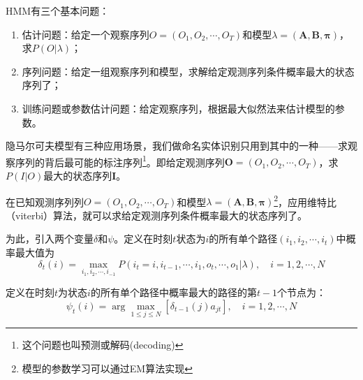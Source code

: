 \documentclass[a4paper,UTF8,no-math]{ctexart}
\begin{document}
	HMM有三个基本问题：
	
	\begin{enumerate}
		\item 估计问题：给定一个观察序列$O = (O_{1},O_{2}, \cdots ,O_{T})$和模型$\lambda=(\mathbf{A}, \mathbf{B},\mathbf{\pi})$，求$P(O | \lambda)$；
		\item 序列问题：给定一组观察序列和模型，求解给定观测序列条件概率最大的状态序列了；
		\item 训练问题或参数估计问题：给定观察序列，根据最大似然法来估计模型的参数。
	\end{enumerate}
	
	隐马尔可夫模型有三种应用场景，我们做命名实体识别只用到其中的一种——求观察序列的背后最可能的标注序列\footnote{这个问题也叫预测或解码(decoding)}。即给定观测序列$\mathbf{O} = (O_{1},O_{2}, \cdots ,O_{T})$，求$P(I|O)$最大的状态序列$\mathbf{I}$。
	
	在已知观测序列列$O = (O_{1},O_{2}, \cdots ,O_{T})$和模型$\lambda=(\mathbf{A}, \mathbf{B},\mathbf{\pi})$\footnote{模型的参数学习可以通过EM算法实现}，应用维特比（viterbi）算法，就可以求给定观测序列条件概率最大的状态序列了。
	
	为此，引入两个变量$\delta$和$\psi$。定义在时刻$t$状态为$i$的所有单个路径$\left(i_{1}, i_{2}, \cdots, i_{t}\right)$中概率最大值为$$\delta_{t}(i)=\max _{i_{1}, i_{2}, \cdots, i_{-1}} P\left(i_{t}=i, i_{t-1}, \cdots, i_{1}, o_{t}, \cdots, o_{1} | \lambda\right), \quad i=1,2, \cdots, N$$
	
	定义在时刻$t$为状态$i$的所有单个路径中概率最大的路径的第$t-1$个节点为：$$\psi_{t}(i)=\arg \max _{1 \leq j \leqslant N}\left[\delta_{t-1}(j) a_{j t}\right], \quad i=1,2, \cdots, N$$
	
	\newpage
	
\end{document}
